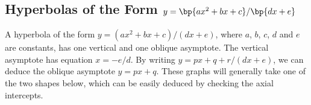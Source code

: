 \subsection{Hyperbolas of the Form \texorpdfstring{$y = \bp{ax^2 + bx + c}/\bp{dx + e}$}{y = (ax2 + bx + c)/(dx + e)}}

A hyperbola of the form $y = (ax^2 + bx + c)/(dx + e)$, where $a$, $b$, $c$, $d$ and $e$ are constants, has one vertical and one oblique asymptote. The vertical asymptote has equation $x = -e/d$. By writing $y = px + q + r/(dx + e)$, we can deduce the oblique asymptote $y = px + q$. These graphs will generally take one of the two shapes below, which can be easily deduced by checking the axial intercepts.

\noindent\begin{minipage}{0.5\textwidth}
    \begin{figure}[H]
        \centering
        \captionsetup{singlelinecheck=false, aboveskip=7pt, belowskip=0pt,justification=centering}
        \setcapindent{0pt}
        \caption{}
    \end{figure}
\end{minipage}%
